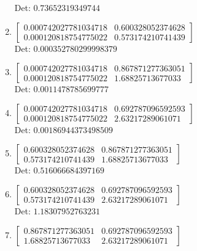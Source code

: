 \documentclass[12pt]{article}
\begin{document}
\begin{enumerate}
Det: $0.73652319349744$\\

\item $\displaystyle \left[\begin{matrix}0.000742027781034718 & 0.600328052374628\\0.000120818754775022 & 0.573174210741439\end{matrix}\right]$\\

Det: $0.000352780299998379$\\

\item $\displaystyle \left[\begin{matrix}0.000742027781034718 & 0.867871277363051\\0.000120818754775022 & 1.68825713677033\end{matrix}\right]$\\

Det: $0.0011478785699777$\\

\item $\displaystyle \left[\begin{matrix}0.000742027781034718 & 0.692787096592593\\0.000120818754775022 & 2.63217289061071\end{matrix}\right]$\\

Det: $0.00186944373498509$\\

\item $\displaystyle \left[\begin{matrix}0.600328052374628 & 0.867871277363051\\0.573174210741439 & 1.68825713677033\end{matrix}\right]$\\

Det: $0.516066684397169$\\

\item $\displaystyle \left[\begin{matrix}0.600328052374628 & 0.692787096592593\\0.573174210741439 & 2.63217289061071\end{matrix}\right]$\\

Det: $1.18307952763231$\\

\item $\displaystyle \left[\begin{matrix}0.867871277363051 & 0.692787096592593\\1.68825713677033 & 2.63217289061071\end{matrix}\right]$\\


\end{enumerate}
\end{document}
